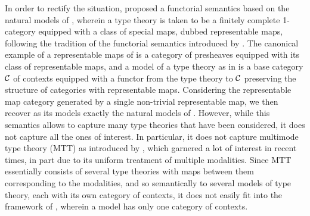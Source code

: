 \documentclass[../thesis.tex]{subfiles}
\begin{document}
In order to rectify the situation, \textcite{uemura2023} proposed a functorial semantics based on the natural models of
\cite{awodey2017}, wherein a type theory is taken to be a finitely complete 1-category equipped with a class of special maps,
dubbed representable maps, following the tradition of the functorial semantics introduced by \cite{lawvere1963}. The canonical
example of a representable maps of is a category of presheaves equipped with its class of representable maps, and a model of a
type theory as in \cite{uemura2023} is a base category ${\mathcal{C}}$ of contexts equipped with a functor from the type theory to ${\mathcal{C}}$
preserving the structure of categories with representable maps. Considering the representable map category generated by a single
non-trivial representable map, we then recover as its models exactly the natural models of \cite{awodey2017}. However, while this
semantics allows to capture many type theories that have been considered, it does not capture all the ones of interest. In
particular, it does not capture multimode type theory (MTT) as introduced by \textcite{gratzer2021}, which garnered a lot of
interest in recent times, in part due to its uniform treatment of multiple modalities. Since MTT essentially consists of several
type theories with maps between them corresponding to the modalities, and so semantically to several models of type theory, each
with its own category of contexts, it does not easily fit into the framework of \cite{uemura2023}, wherein a model has only one
category of contexts.
\end{document}
